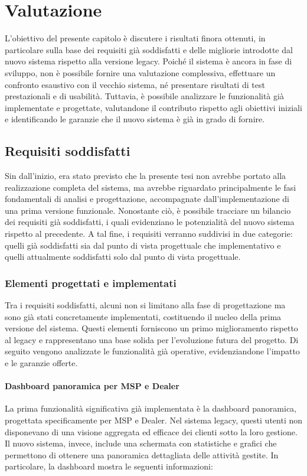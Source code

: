 \chapter{Valutazione}

L'obiettivo del presente capitolo è discutere i risultati finora ottenuti, in particolare sulla base dei requisiti già soddisfatti e delle migliorie introdotte dal nuovo sistema rispetto alla versione legacy. Poiché il sistema è ancora in fase di sviluppo, non è possibile fornire una valutazione complessiva, effettuare un confronto esaustivo con il vecchio sistema, né presentare risultati di test prestazionali e di usabilità. Tuttavia, è possibile analizzare le funzionalità già implementate e progettate, valutandone il contributo rispetto agli obiettivi iniziali e identificando le garanzie che il nuovo sistema è già in grado di fornire.

\section{Requisiti soddisfatti}
Sin dall'inizio, era stato previsto che la presente tesi non avrebbe portato alla realizzazione completa del sistema, ma avrebbe riguardato principalmente le fasi fondamentali di analisi e progettazione, accompagnate dall'implementazione di una prima versione funzionale. Nonostante ciò, è possibile tracciare un bilancio dei requisiti già soddisfatti, i quali evidenziano le potenzialità del nuovo sistema rispetto al precedente. A tal fine, i requisiti verranno suddivisi in due categorie: quelli già soddisfatti sia dal punto di vista progettuale che implementativo e quelli attualmente soddisfatti solo dal punto di vista progettuale.

\subsection{Elementi progettati e implementati}
Tra i requisiti soddisfatti, alcuni non si limitano alla fase di progettazione ma sono già stati concretamente implementati, costituendo il nucleo della prima versione del sistema. Questi elementi forniscono un primo miglioramento rispetto al legacy e rappresentano una base solida per l’evoluzione futura del progetto. Di seguito vengono analizzate le funzionalità già operative, evidenziandone l'impatto e le garanzie offerte.

\subsubsection{Dashboard panoramica per MSP e Dealer}
La prima funzionalità significativa già implementata è la dashboard panoramica, progettata specificamente per MSP e Dealer. Nel sistema legacy, questi utenti non disponevano di una visione aggregata ed efficace dei clienti sotto la loro gestione. Il nuovo sistema, invece, include una schermata con statistiche e grafici che permettono di ottenere una panoramica dettagliata delle attività gestite. In particolare, la dashboard mostra le seguenti informazioni:

